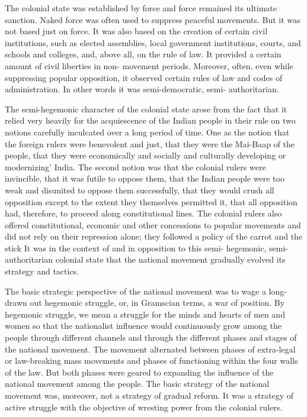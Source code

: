 The colonial state was established by force and force remained its ultimate sanction. Naked force was often used to suppress peaceful movements. But it was not based just on force. It was also based on the creation of certain civil institutions, such as elected assemblies, local government institutions, courts, and schools and colleges, and, above all, on the rule of law. It provided a certain amount of civil liberties in non- movement periods. Moreover, often, even while suppressing popular opposition, it observed certain rules of law and codes of administration. In other words it was semi-democratic, semi- authoritarian.

The semi-hegemonic character of the colonial state arose from the fact that it relied very heavily for the acquiescence of the Indian people in their rule on two notions carefully inculcated over a long period of time. One as the notion that the foreign rulers were benevolent and just, that they were the Mai-Baap of the people, that they were economically and socially and culturally developing or modernizing' India. The second notion was that the colonial rulers were invincible, that it was futile to oppose them, that the Indian people were too weak and disunited to oppose them successfully, that they would crush all opposition except to the extent they themselves permitted it, that all opposition had, therefore, to proceed along constitutional lines. The colonial rulers also offered constitutional, economic and other concessions to popular movements and did not rely on their repression alone; they followed a policy of the carrot and the stick It was in the context of and in opposition to this semi- hegemonic, semi-authoritarian colonial state that the national movement gradually evolved its strategy and tactics.

The basic strategic perspective of the national movement was to wage a long-drawn out hegemonic struggle, or, in Gramscian terms, a war of position. By hegemonic struggle, we mean a struggle for the minds and hearts of men and women so that the nationalist influence would continuously grow among the people through different channels and through the different phases and stages of the national movement. The movement alternated between phases of extra-legal or law-breaking mass movements and phases of functioning within the four walls of the law. But both phases were geared to expanding the influence of the national movement among the people. The basic strategy of the national movement was, moreover, not a strategy of gradual reform. It was a strategy of active struggle with the objective of wresting power from the colonial rulers.

